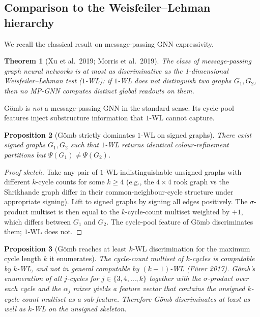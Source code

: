 \documentclass[11pt,a4paper]{article}
\newtheorem{theorem}{Theorem}[section]
\newtheorem{proposition}[theorem]{Proposition}
\newcommand{\WL}{\textsf{WL}}
\newcommand{\Gomb}{G\"omb}
\begin{document}
\subsection{Comparison to the Weisfeiler--Lehman hierarchy}

We recall the classical result on message-passing GNN expressivity.

\begin{theorem}[Xu et al.~2019; Morris et al.~2019]\label{thm:wl1}
The class of message-passing graph neural networks is at most as
discriminative as the 1-dimensional Weisfeiler--Lehman test
($1$-\WL): if $1$-\WL{} does not distinguish two graphs $G_1, G_2$,
then no MP-GNN computes distinct global readouts on them.
\end{theorem}

\Gomb{} is \emph{not} a message-passing GNN in the standard sense.
Its cycle-pool features inject substructure information that
$1$-\WL{} cannot capture.

\begin{proposition}[\Gomb{} strictly dominates $1$-\WL{} on signed graphs]
\label{prop:dom-1wl}
There exist signed graphs $G_1, G_2$ such that $1$-\WL{} returns
identical colour-refinement partitions but $\Psi(G_1) \neq
\Psi(G_2)$.
\end{proposition}

\begin{proof}[Proof sketch]
Take any pair of $1$-\WL-indistinguishable unsigned graphs with
different $k$-cycle counts for some $k \geq 4$ (e.g., the
$4 \times 4$ rook graph vs the Shrikhande graph differ in their
common-neighbour-cycle structure under appropriate signing). Lift
to signed graphs by signing all edges positively. The
$\sigma$-product multiset is then equal to the $k$-cycle-count
multiset weighted by $+1$, which differs between $G_1$ and $G_2$.
The cycle-pool feature of \Gomb{} discriminates them; $1$-\WL{}
does not.
\end{proof}

\begin{proposition}[\Gomb{} reaches at least $k$-\WL{} discrimination
for the maximum cycle length $k$ it enumerates]\label{prop:reach-kwl}
The cycle-count multiset of $k$-cycles is computable by $k$-\WL,
and not in general computable by $(k-1)$-\WL{} (F\"urer 2017).
\Gomb's enumeration of all $j$-cycles for $j \in \{3, 4, \ldots, k\}$
together with the $\sigma$-product over each cycle and the
$\alpha_j$ mixer yields a feature vector that contains the unsigned
$k$-cycle count multiset as a sub-feature. Therefore \Gomb{}
discriminates at least as well as $k$-\WL{} on the unsigned
skeleton.
\end{proposition}
\end{document}
